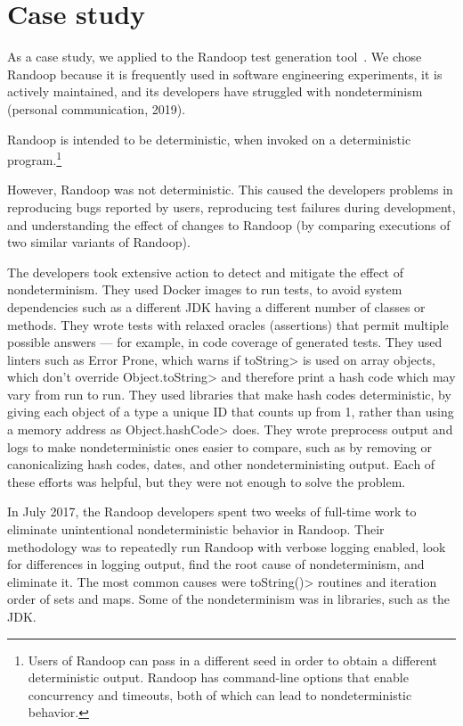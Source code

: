 \section{Case study}\label{sec:randoop-case-study}


As a case study, we applied \theDeterminismChecker to the Randoop test
generation tool~\ifanonymous{}\else\cite{PachecoLEB2007}\fi.
We chose Randoop because 
it is frequently used in software engineering experiments,
it is actively maintained,
and its developers have struggled with nondeterminism (personal
communication, 2019).

Randoop is intended to be deterministic, when invoked on a deterministic
program.\footnote{Users of Randoop can pass in a different seed in order to
  obtain a different deterministic output.  Randoop has command-line
  options that enable concurrency and timeouts, both of which can lead to
  nondeterministic behavior.}

However, Randoop was not deterministic.  This caused the developers
problems in 
reproducing bugs reported by users, 
reproducing test failures during development, and
understanding the effect of changes to Randoop (by comparing executions of two
similar variants of Randoop).

The developers took extensive action to detect and mitigate the effect of nondeterminism.
They used Docker images to run tests, to avoid system dependencies such as
a different JDK having a different number of classes or methods.
They wrote tests with relaxed oracles (assertions) that permit multiple
possible answers --- for example, in code coverage of generated tests.
They used linters such as Error Prone, which warns if \<toString> is used on
array objects, which don't override \<Object.toString> and therefore print a
hash code which may vary from run to run.
They used libraries that make hash codes deterministic, by giving each
object of a type a unique ID that counts up from 1, rather than using a
memory address as \<Object.hashCode> does.
They wrote preprocess output and logs to make nondeterministic ones easier
to compare, such as by removing or canonicalizing hash codes, dates, and
other nondeterministing output.
Each of these efforts was helpful, but they were not enough to solve the problem.

In July 2017, the Randoop developers spent two weeks of full-time work to
eliminate unintentional nondeterministic behavior in Randoop.
Their methodology was to repeatedly
 run Randoop with verbose logging enabled,
 look for differences in logging output,
 find the root cause of nondeterminism,
 and eliminate it.
The most common causes were \<toString()> routines and iteration order of sets and maps.
Some of the nondeterminism was in libraries, such as the JDK\@.

